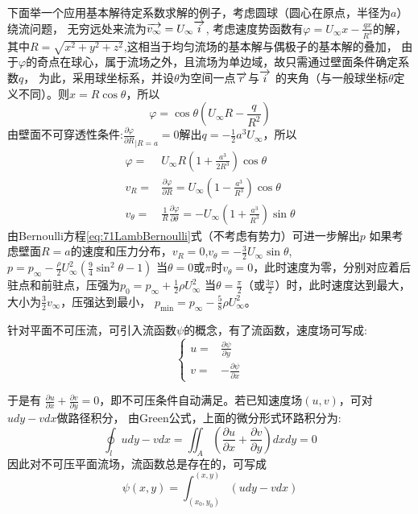 下面举一个应用基本解待定系数求解的例子，考虑圆球（圆心在原点，半径为$a$）绕流问题，
无穷远处来流为$\overrightarrow{v_{\infty}}=U_{\infty}\overrightarrow{i}$,
考虑速度势函数有$\varphi=U_{\infty} x-\frac{qx}{R^3}$的解，
其中$R=\sqrt{x^2+y^2+z^2}$,这相当于均匀流场的基本解与偶极子的基本解的叠加，
由于$\varphi$的奇点在球心，属于流场之外，且流场为单边域，故只需通过壁面条件确定系数$q$，
为此，采用球坐标系，并设$\theta$为空间一点$\overrightarrow{r}$与$\overrightarrow{i}$
的夹角（与一般球坐标$\theta$定义不同）。则$x=R\cos\theta$，所以
\begin{equation}
\varphi=\cos\theta(U_{\infty}R-\frac{q}{R^2})
\end{equation}
由壁面不可穿透性条件:$\frac{\partial \varphi}{\partial R}_{|R=a}=0$解出$q=-\frac{1}{2}a^3U_{\infty}$，所以
\begin{align*}
\varphi=&U_{\infty}R(1+\frac{a^3}{2R^3})\cos\theta\\
v_R=&\frac{\partial \varphi}{\partial R}=U_{\infty}(1-\frac{a^3}{R^3})\cos\theta\\
v_{\theta}=&\frac{1}{R}\frac{\partial \varphi}{\partial \theta}=-U_{\infty}(1+\frac{a^3}{R^3})\sin\theta
\end{align*}
由Bernoulli方程\eqref{eq:71LambBernoulli}式（不考虑有势力）可进一步解出$p$
如果考虑壁面$R=a$的速度和压力分布，$v_R=0$,$v_{\theta}=-\frac{3}{2}U_{\infty}\sin\theta$,
$p=p_{\infty}-\frac{\rho}{2}U_{\infty}^2(\frac{9}{4}\sin^2\theta-1)$
当$\theta=0$或$\pi$时$v_{\theta}=0$，此时速度为零，分别对应着后驻点和前驻点，压强为$p_0=p_{\infty}+\frac{1}{2}\rho U^2_{\infty}$
当$\theta=\frac{\pi}{2}$（或$\frac{3\pi}{2}$）时，此时速度达到最大，大小为$\frac{3}{2}v_{\infty}$，压强达到最小，
$p_{\textrm{min}}=p_{\infty}-\frac{5}{8}\rho U^2_{\infty}$。

针对平面不可压流，可引入流函数$\psi$的概念，有了流函数，速度场可写成:
\begin{equation}
\begin{cases}
u=& \frac{\partial \psi}{\partial y}\\
v=& -\frac{\partial \psi}{\partial x}
\end{cases}
\end{equation}

于是有
$\frac{\partial u}{\partial x}+\frac{\partial v}{\partial y}=0$，即不可压条件自动满足。若已知速度场$(u,v)$，可对$udy-vdx$做路径积分，
由Green公式，上面的微分形式环路积分为:
\begin{equation}
\oint_{l} udy-vdx=\iint_{A} (\frac{\partial u}{\partial x}+\frac{\partial v}{\partial y})dxdy=0
\end{equation}
因此对不可压平面流场，流函数总是存在的，可写成
\begin{equation}\label{eq:81streamFun}
\psi(x,y)=\int_{(x_0,y_0)}^{(x,y)} (udy-vdx)
\end{equation}

